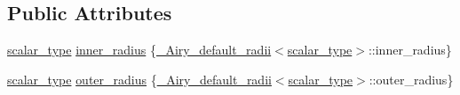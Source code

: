 \subsection*{Public Attributes}
\begin{DoxyCompactItemize}
\item 
\hyperlink{classstd_1_1____detail_1_1__Airy_a266cdfcc86b36c8743fd0e102387e1f0}{scalar\+\_\+type} \hyperlink{classstd_1_1____detail_1_1__Airy_ae619970f4c54b7f80340f05b7ead83e1}{inner\+\_\+radius} \{\hyperlink{structstd_1_1____detail_1_1__Airy__default__radii}{\+\_\+\+Airy\+\_\+default\+\_\+radii}$<$\hyperlink{classstd_1_1____detail_1_1__Airy_a266cdfcc86b36c8743fd0e102387e1f0}{scalar\+\_\+type}$>$\+::inner\+\_\+radius\}
\item 
\hyperlink{classstd_1_1____detail_1_1__Airy_a266cdfcc86b36c8743fd0e102387e1f0}{scalar\+\_\+type} \hyperlink{classstd_1_1____detail_1_1__Airy_af688e5d14ed305f95f0e9d9d58d3bf9a}{outer\+\_\+radius} \{\hyperlink{structstd_1_1____detail_1_1__Airy__default__radii}{\+\_\+\+Airy\+\_\+default\+\_\+radii}$<$\hyperlink{classstd_1_1____detail_1_1__Airy_a266cdfcc86b36c8743fd0e102387e1f0}{scalar\+\_\+type}$>$\+::outer\+\_\+radius\}
\end{DoxyCompactItemize}
